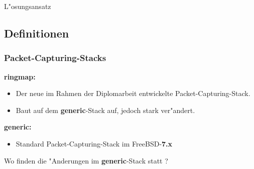 \documentclass{beamer}
\begin{document}
\begin{frame}
	\begin{center}
	\huge{L"osungsansatz}
	\end{center}
\end{frame}


\subsection*{Definitionen}
\begin{frame}
\frametitle{Packet-Capturing-Stacks}
\textbf{ringmap:}
\begin{itemize}
	\item Der neue im Rahmen der Diplomarbeit entwickelte Packet-Capturing-Stack.
	\item Baut auf dem \textbf{generic}-Stack auf, jedoch stark ver"andert.\newline
\end{itemize}
\textbf{generic:}
\begin{itemize}
	\item Standard Packet-Capturing-Stack im FreeBSD-\textbf{7.x}\newline
\end{itemize}
Wo finden die "Anderungen im \textbf{generic}-Stack statt ?
\end{frame}
\end{document}
